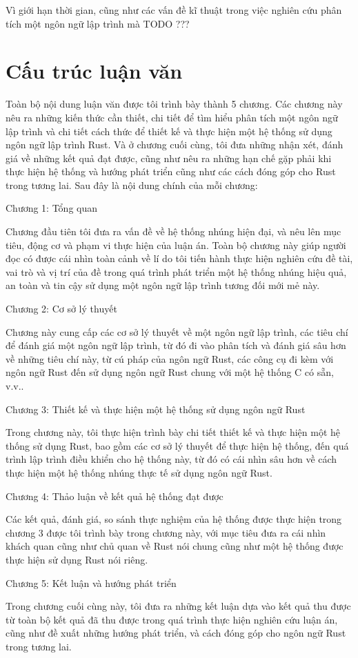 Vì giới hạn thời gian, cũng như các vấn đề kĩ thuật trong việc nghiên cứu phân tích một ngôn ngữ lập trình mà TODO ???

\section{Cấu trúc luận văn}
Toàn bộ nội dung luận văn được tôi trình bày thành 5 chương. Các chương này nêu ra những kiến thức cần thiết, chi tiết để tìm hiểu phân tích một ngôn ngữ lập trình và chi tiết cách thức để thiết kế và thực hiện một hệ thống sử dụng ngôn ngữ lập trình Rust. Và ở chương cuối cùng, tôi đưa những nhận xét, đánh giá về những kết quả đạt được, cũng như nêu ra những hạn chế gặp phải khi thực hiện hệ thống và hướng phát triển cũng như các cách đóng góp cho Rust trong tương lai. Sau đây là nội dung chính của mỗi chương:

Chương 1: Tổng quan

Chương đầu tiên tôi đưa ra vấn đề về hệ thống nhúng hiện đại, và nêu lên mục tiêu, động cơ và phạm vi thực hiện của luận án. Toàn bộ chương này giúp người đọc có được cái nhìn toàn cảnh về lí do tôi tiến hành thực hiện nghiên cứu đề tài, vai trò và vị trí của đề trong quá trình phát triển một hệ thống nhúng hiệu quả, an toàn và tin cậy sử dụng một ngôn ngữ lập trình tương đối mới mẻ này.

Chương 2: Cơ sở lý thuyết

Chương này cung cấp các cơ sở lý thuyết về một ngôn ngữ lập trình, các tiêu chí để đánh giá một ngôn ngữ lập trình, từ đó đi vào phân tích và đánh giá sâu hơn về những tiêu chí này, từ cú pháp của ngôn ngữ Rust, các công cụ đi kèm với ngôn ngữ Rust đến sử dụng ngôn ngữ Rust chung với một hệ thống C có sẵn, v.v..

Chương 3: Thiết kế và thực hiện một hệ thống sử dụng ngôn ngữ Rust

Trong chương này, tôi thực hiện trình bày chi tiết thiết kế và thực hiện một hệ thống sử dụng Rust, bao gồm các cơ sở lý thuyết để thực hiện hệ thống, đến quá trình lập trình điều khiển cho hệ thống này, từ đó có cái nhìn sâu hơn về cách thực hiện một hệ thống nhúng thực tế sử dụng ngôn ngữ Rust.

Chương 4: Thảo luận về kết quả hệ thống đạt được

Các kết quả, đánh giá, so sánh thực nghiệm của hệ thống được thực hiện trong chương 3 được tôi trình bày trong chương này, với mục tiêu đưa ra cái nhìn khách quan cũng như chủ quan về Rust nói chung cũng như một hệ thống được thực hiện sử dụng Rust nói riêng.

Chương 5: Kết luận và hướng phát triển

Trong chương cuối cùng này, tôi đưa ra những kết luận dựa vào kết quả thu được từ toàn bộ kết quả đã thu được trong quá trình thực hiện nghiên cứu luận án, cũng như đề xuất những hướng phát triển, và cách đóng góp cho ngôn ngữ Rust trong tương lai.
